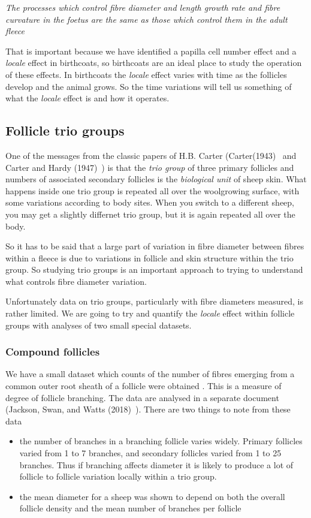 \documentclass[titlepage]{article}  %
\begin{document}
{\em The processes which control fibre diameter and length growth rate and fibre curvature in the foetus are the same as those which control them in the adult fleece}

That is important because  we have identified a papilla cell number effect and a {\em locale} effect in birthcoats, so birthcoats are an ideal place to study the operation of these effects. In birthcoats the {\em locale} effect varies with time as the follicles develop and the animal grows. So the time variations will tell us something of what the {\em locale} effect is and how it operates. 




\subsection{Follicle trio groups}
One of the messages from the classic papers of H.B. Carter (Carter(1943)~\cite{cart:43} and Carter and Hardy (1947)~\cite{cart:47}) is that the {\em trio group} of three primary follicles and numbers of associated secondary follicles is the {\em biological unit} of sheep skin. What happens inside one trio group is repeated all over the woolgrowing surface, with some variations according to body sites. When you switch to  a different sheep, you may get a slightly differnet trio group, but it is again repeated all over the body.

So it has to be said that a large part of variation in fibre diameter between fibres within a fleece is due to variations in follicle and skin structure within the trio group. So studying trio groups is an important approach to trying to understand what controls fibre diameter variation. 

Unfortunately data on trio groups, particularly with fibre diameters measured, is rather limited.  We are going to try and quantify the {\em locale} effect within follicle groups with analyses of two small special datasets.

\subsubsection{Compound follicles}
We have a small dataset  which counts of the number of fibres emerging from a common outer root sheath of a follicle were obtained .  This is a measure of degree of follicle branching. The data are analysed in a separate document (Jackson, Swan, and Watts (2018)~\cite{jack:18c}). There are two things to note from these data
\begin{itemize}
\item the number of branches in a branching follicle varies widely. Primary follicles varied from 1 to 7 branches, and secondary follicles varied from 1 to 25 branches. Thus if branching affects diameter it is likely to produce a lot of follicle to follicle variation locally within a trio group.
\item the mean diameter for a sheep was shown to depend on both the overall follicle density and the mean number of branches per follicle
\end{itemize}
\end{document}
